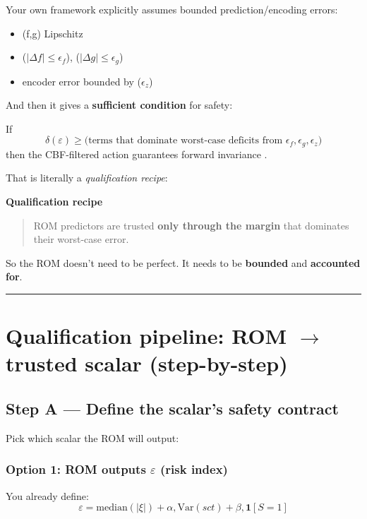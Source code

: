 \documentclass[11pt,a4paper]{article}
\begin{document}
Your own framework explicitly assumes bounded prediction/encoding errors:

\begin{itemize}
\item (f,g) Lipschitz
\item ($|\Delta f|\le \epsilon_f$), ($|\Delta g|\le \epsilon_g$)
\item encoder error bounded by ($\epsilon_z$)
\end{itemize}

And then it gives a \textbf{sufficient condition} for safety:

If
\[
\delta(\varepsilon)\ge \text{(terms that dominate worst-case deficits from } \epsilon_f,\epsilon_g,\epsilon_z\text{)}
\]
then the CBF-filtered action guarantees forward invariance .

That is literally a \textit{qualification recipe}:

\begin{schema}
\textbf{Qualification recipe}\\[-0.25em]
\begin{quote}
ROM predictors are trusted \textbf{only through the margin} that dominates their worst-case error.
\end{quote}
\end{schema}

So the ROM doesn’t need to be perfect.
It needs to be \textbf{bounded} and \textbf{accounted for}.

\hrule
\vspace{0.75em}

\section{Qualification pipeline: ROM $\to$ trusted scalar (step-by-step)}

\subsection*{Step A — Define the scalar’s safety contract}

Pick which scalar the ROM will output:

\subsubsection*{Option 1: ROM outputs \textbf{$\varepsilon$} (risk index)}

You already define:
\[
\varepsilon = \text{median}(|\xi|)+\alpha,\text{Var}(sct)+\beta,\mathbf 1[S=1]
\]
\end{document}
